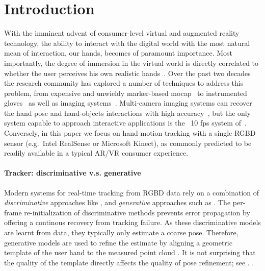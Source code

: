 % 
% 
% 
% 



\section{Introduction}
With the imminent advent of consumer-level virtual and augmented reality technology, the ability to interact with the digital world with the most natural mean of interaction, our hands, becomes of paramount importance. Most importantly, the degree of immersion in the virtual world is directly correlated to whether the user perceives his own realistic hands~. Over the past two decades the research community has explored a number of techniques to address this problem, from expensive and unwieldy marker-based mocap~ to instrumented gloves~\cite{dipietro2008survey} as well as imaging systems~\cite{erol2007survey}. Multi-camera imaging systems can recover the hand pose and hand-objects interactions with high accuracy~\cite{ballan2013salient}, but the only system capable to approach interactive applications is the ~10 fps system of~\cite{sridhar2013multicam}. Conversely, in this paper we focus on hand motion tracking with a single RGBD sensor (e.g.\ Intel RealSense or Microsoft Kinect), as commonly predicted to be readily available in a typical AR/VR consumer experience.

\paragraph{Tracker: discriminative v.s. generative}
Modern systems for real-time tracking from RGBD data  \cite{sridhar2015fast,sharp2015accurate} rely on a combination of \emph{discriminative} approaches like \cite{oberweger2015feedback}, and \emph{generative} approaches such as \cite{tagliasacchi2015robust}. The per-frame re-initialization of discriminative methods prevents error propagation by offering a continous recovery from tracking failure. As these discriminative models are learnt from data, they typically only estimate a coarse pose. Therefore, generative models are used to refine the estimate by aligning a geometric template of the user hand to the measured point cloud . It is not surprising that the quality of the template directly affects the quality of pose refinement; see . 
.

